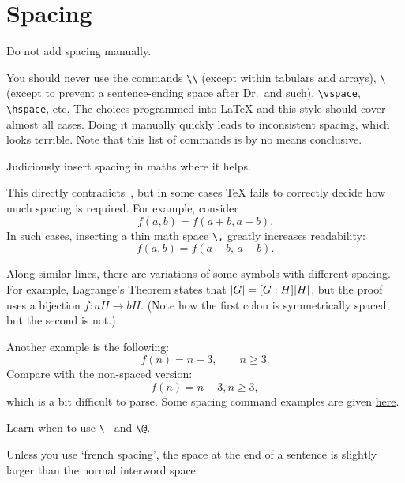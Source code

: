 \section{Spacing}

\begin{Rule}
  \label{rule:no-manual-spacing}
  Do not add spacing manually.
\end{Rule}

You should never use the commands \lstinline-\\- (except within
tabulars and arrays), \lstinline[showspaces=true]-\ - (except to
prevent a sentence-ending space after Dr.\ and such),
\lstinline-\vspace-, \lstinline-\hspace-, etc.  The choices programmed
into \LaTeX{} and this style should cover almost all cases.  Doing it
manually quickly leads to inconsistent spacing, which looks terrible.
Note that this list of commands is by no means conclusive.

\begin{Rule}
  Judiciously insert spacing in maths where it helps.
\end{Rule}

This directly contradicts~, but in
some cases \TeX{} fails to correctly decide how much spacing is
required.  For example, consider
\begin{displaymath}
  f(a,b) = f(a+b, a-b).
\end{displaymath}
In such cases, inserting a thin math space \lstinline-\,- greatly
increases readability:
\begin{displaymath}
  f(a,b) = f(a+b,\, a-b).
\end{displaymath}

Along similar lines, there are variations of some symbols with
different spacing.  For example, Lagrange's Theorem states that
\(\lvert G\rvert=[G:H]\lvert H\rvert\), but the proof uses a bijection \(f\colon
aH\to bH\).  (Note how the first colon is symmetrically spaced, but
the second is not.)

Another example is the following:
\[f(n) = n - 3, \qquad n \ge 3.\]
Compare with the non-spaced version:
\[f(n) = n - 3, n \ge 3,\]
which is a bit difficult to parse. Some spacing command examples are given \href{https://www.overleaf.com/learn/latex/Spacing_in_math_mode}{here}.
\begin{Rule}
  Learn when to use \lstinline[showspaces=true]-\ - and
  \lstinline-\@-.
\end{Rule}

Unless you use `french spacing', the space at the end of a sentence is
slightly larger than the normal interword space.

